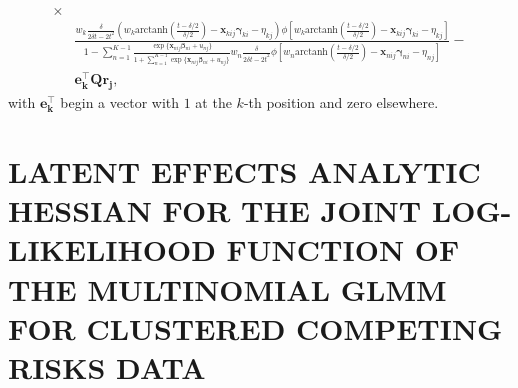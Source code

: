 \documentclass[12pt, %
               openright, %
               oneside, %
               a4paper, %
               chapter=TITLE, %
               section=TITLE, %
               brazil,
               english %
]{abntex2}
\begin{document}
\begin{apendicesenv}
\begin{align*}
    \times\\
  &\frac{
    w_{k}\frac{\delta}{2\delta t - 2t^{2}}
    (w_{k}\text{arctanh}\left(\frac{t-\delta/2}{\delta/2}\right)
    - \bm{x}_{kij}\bm{\gamma}_{ki} - \eta_{kj})
    \phi[w_{k} \text{arctanh}\left(\frac{t-\delta/2}{\delta/2}\right)
    - \bm{x}_{kij}\bm{\gamma}_{ki} - \eta_{kj}
    ]}{1 -
    \sum_{n = 1}^{K-1}
    \frac{\exp\{\bm{x}_{nij}\bm{\beta}_{ni} + u_{nj}\}}{1 +
    \sum_{n = 1}^{K-1}\exp\{\bm{x}_{nij}\bm{\beta}_{ni} + u_{nj}\}}
    w_{n}\frac{\delta}{2\delta t - 2t^{2}}
    \phi[w_{n}\text{arctanh}\left(\frac{t-\delta/2}{\delta/2}\right)
    - \bm{x}_{nij}\bm{\gamma}_{ni} - \eta_{nj}]} -\\
  &\bm{e_{k}^{\top}Qr_{j}},
\end{align*}
with \(\bm{e_{k}^{\top}}\) begin a vector with \(1\) at the \(k\)-th
position and zero elsewhere.

\chapter{LATENT EFFECTS ANALYTIC HESSIAN FOR THE JOINT
  LOG-LIKELIHOOD FUNCTION OF THE MULTINOMIAL GLMM FOR
  CLUSTERED COMPETING RISKS DATA}
\label{cap:appendixB}


\end{apendicesenv}
\end{document}

